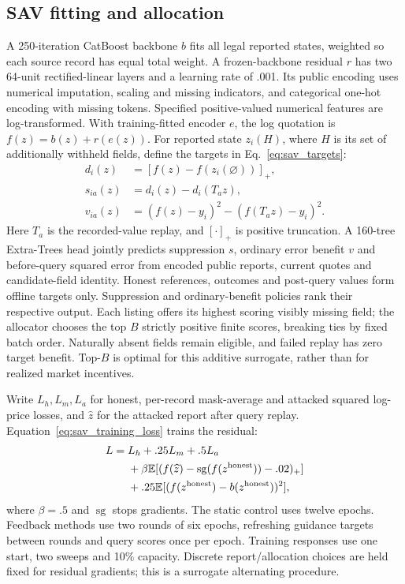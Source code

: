 \subsection{SAV fitting and allocation}
\label{sec:sav_fitting}
A 250-iteration CatBoost backbone $b$ fits all legal reported states,
weighted so each source record has equal total weight. A frozen-backbone
residual $r$ has two 64-unit rectified-linear layers and a learning rate of .001. Its public
encoding uses numerical imputation, scaling and missing indicators, and
categorical one-hot encoding with missing tokens. Specified positive-valued
numerical features are log-transformed. With training-fitted encoder $e$,
the log quotation is $f(z)=b(z)+r(e(z))$. For reported state $z_i(H)$,
where $H$ is its set of additionally withheld fields, define the targets
in Eq.~\eqref{eq:sav_targets}:
\begin{align}
 d_i(z)&=[f(z)-f(z_i(\varnothing))]_+,\nonumber\\
 s_{ia}(z)&=d_i(z)-d_i(T_a z),\nonumber\\
 v_{ia}(z)&=(f(z)-y_i)^2-(f(T_a z)-y_i)^2.
 \label{eq:sav_targets}
\end{align}
Here $T_a$ is the recorded-value replay, and $[\cdot]_+$ is positive
truncation. A 160-tree Extra-Trees head jointly predicts suppression $s$,
ordinary error benefit $v$ and before-query squared error from encoded public
reports, current quotes and candidate-field identity. Honest references,
outcomes and post-query values form offline targets only. Suppression and
ordinary-benefit policies rank their respective output. Each listing offers
its highest scoring visibly missing field; the allocator chooses the top
$B$ strictly positive finite scores, breaking ties by fixed batch order.
Naturally absent fields remain eligible, and failed replay has zero target
benefit. Top-$B$ is optimal for this additive surrogate, rather than for
realized market incentives.

Write $L_h,L_m,L_a$ for honest, per-record mask-average and attacked
squared log-price losses, and $\widehat z$ for the attacked report after
query replay. Equation~\eqref{eq:sav_training_loss} trains the residual:
\begin{align}
 L={}&L_h+.25L_m+.5L_a\nonumber\\
 &+\beta\mathbb E[(f(\widehat z)-
 \operatorname{sg}(f(z^{\rm honest}))-.02)_+]\nonumber\\
 &+.25\mathbb E[(f(z^{\rm honest})-b(z^{\rm honest}))^2],
 \label{eq:sav_training_loss}
\end{align}
where $\beta=.5$ and $\operatorname{sg}$ stops gradients.
The static control uses twelve epochs. Feedback methods use two rounds of
six epochs, refreshing guidance targets between rounds and query scores
once per epoch. Training responses use one start, two sweeps and 10\%
capacity. Discrete report/allocation choices are held fixed for residual
gradients; this is a surrogate alternating procedure.

